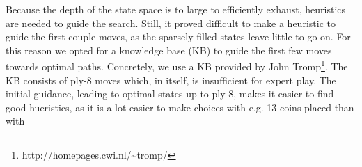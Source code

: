Because the depth of the state space is to large to efficiently exhaust,
heuristics are needed to guide the search. Still, it proved difficult to make a
heuristic to guide the first couple moves, as the sparsely filled states leave
little to go on. For this reason we opted for a knowledge base (KB) to guide the
first few moves towards optimal paths. Concretely, we use a KB provided by John
Tromp\footnote{http://homepages.cwi.nl/\textasciitilde tromp/}. The KB consists
of ply-8 moves which, in itself, is insufficient for expert play. The initial
guidance, leading to optimal states up to ply-8, makes it easier to find good
hueristics, as it is a lot easier to make choices with e.g. 13 coins placed than
with 

